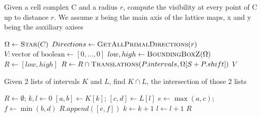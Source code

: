 \documentclass[runningheads]{llncs}
\begin{document}
    \begin{algorithm}
        \caption{Given a cell complex C and a radius $r$, compute the visibility at every point of C up to distance $r$. We assume z being the main axis of the lattice maps, x and y being the auxiliary axises}
        \label{alg:visibility}
        \begin{algorithmic}
                \State $\Omega \gets \Call{Star}{C}$ 
                \State $Directions \gets \Call{GetAllPrimalDirections}{r}$
                \State $V: \text{vector of boolean} \gets [0, \ldots, 0]$ 
                \State $low, high \gets \Call{BoundingBoxZ}{\Omega}$
                        \State $R \gets [low, high]$
                            \State $R \gets R \cap \Call{Translations}{P.intervals,\Omega[S + P.shift]}$
                        \EndFor
                        \State {}
                    \EndFor
                \EndFor
                \State \Return $V$
            \EndFunction
        \end{algorithmic}
    \end{algorithm}

    \begin{algorithm}
        \caption{Given 2 lists of intervals $K$ and $L$, find $K \cap L$, the intersection of those 2 lists}
        \label{alg:intersection}
        \begin{algorithmic}
                \State $R \gets \emptyset$; $k, l \gets 0$
                    \State $[a,b] \gets K[k]$; $[c,d] \gets L[l]$
                    \State $e \gets \max(a, c)$; $f \gets \min(b, d)$
                        \State $R.append([e, f])$
                    \EndIf
                        \State $k \gets k+1$
                    \EndIf
                        \State $l \gets l+1$
                    \EndIf
                \EndWhile
                \State \Return $R$
            \EndFunction
        \end{algorithmic}
    \end{algorithm}
\end{document}
